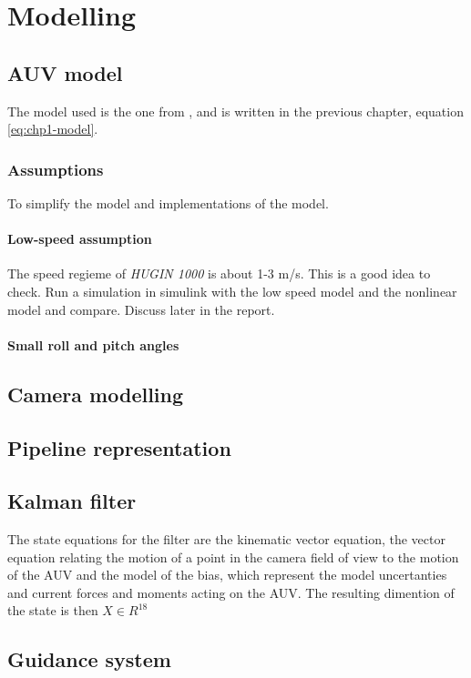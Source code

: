 \chapter{Modelling}


\section{AUV model}
	The model used is the one from \cite{fossen}, and is written in the previous chapter, equation \eqref{eq:chp1-model}.
	
	\subsection{Assumptions}
	To simplify the model and implementations of the model. 
		\subsubsection{Low-speed assumption}
		The speed regieme of \textit{HUGIN 1000} is about 1-3 m/s. This is a good idea to check. Run a simulation in simulink with the low speed model and the nonlinear model and compare. Discuss later in the report.

		\subsubsection{Small roll and pitch angles}


\section{Camera modelling}
	
	


\section{Pipeline representation}


\section{Kalman filter}
	The state equations for the filter are the kinematic vector equation, the vector equation relating the motion of a point in the camera field of view to the motion of the AUV and the model of the bias, which represent the model uncertanties and current forces and moments acting on the AUV. The resulting dimention of the state is then $ X \in R^18$ 


\section{Guidance system}
